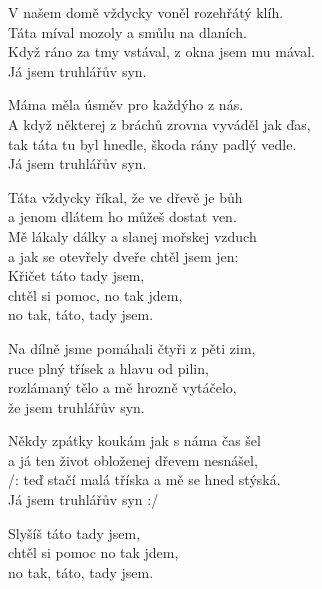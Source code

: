 
\ve{}
V našem domě vždycky voněl rozehřátý klíh.\\
Táta míval mozoly a smůlu na dlaních.\\
Když ráno za tmy vstával, z okna jsem mu mával.\\
Já jsem truhlářův syn.
 
\ve{}
Máma měla úsměv pro každýho z nás.\\
A když některej z bráchů zrovna vyváděl jak ďas,\\
tak táta tu byl hnedle, škoda rány padlý vedle.\\
Já jsem truhlářův syn.

\cho{}
Táta vždycky říkal, že ve dřevě je bůh\\
a jenom dlátem ho můžeš dostat ven.\\
Mě lákaly dálky a slanej mořskej vzduch\\
a jak se otevřely dveře chtěl jsem jen: \\
Křičet táto tady jsem, \\
chtěl si pomoc, no tak jdem, \\
no tak, táto, tady jsem.  
 
\ve{}
Na dílně jsme pomáhali čtyři z pěti zim,\\
ruce plný třísek a hlavu od pilin,\\
rozlámaný tělo a mě hrozně vytáčelo,\\
že jsem truhlářův syn.

\cho{}
      
\ve{} 
Někdy zpátky koukám jak s náma čas šel\\
a já ten život obloženej dřevem nesnášel,\\
/: teď stačí malá tříska a mě se hned stýská.\\
Já jsem truhlářův syn :/

\cho{}
   
\re{*:}
Slyšíš táto tady jsem,\\
chtěl si pomoc no tak jdem,\\
no tak, táto, tady jsem.

\esong{}